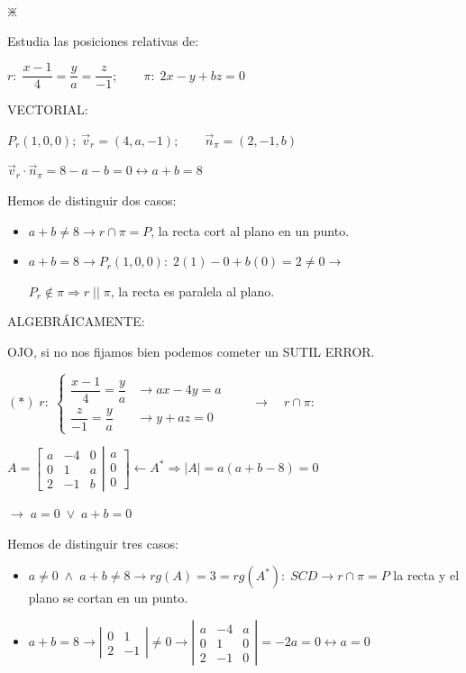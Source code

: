 \begin{ejre}$\boldsymbol{ \divideontimes }$
	
	Estudia las posiciones relativas de:
	
	$r:\;\dfrac{x-1}{4}=\dfrac{y}{a}=\dfrac{z}{-1};\qquad \pi:\; 2x-y+bz=0$
\end{ejre}
\begin{proofw}\renewcommand{\qedsymbol}{$\diamond$}	
\noindent 	VECTORIAL:

\noindent $P_r(1,0,0);\; \vec v_r=(4,a,-1);\qquad \vec n_{\pi}=(2,-1,b)$

\noindent $\vec v_r \cdot \vec n_{\pi}=8-a-b=0 \leftrightarrow a+b=8$

\noindent Hemos de distinguir dos casos:

\begin{itemize}
\item $a+b\neq 8 \to r\cap \pi=P$, la recta cort al plano en un punto.
\item $a+b=8 \to P_r(1,0,0) :\; 2(1)-0+b(0)=2\neq 0 \to $

$P_r\notin \pi \Rightarrow r\;||\;\pi$, la recta es paralela al plano.	
\end{itemize}


\noindent ALGEBRÁICAMENTE:


\noindent OJO, si no nos fijamos bien podemos cometer un SUTIL ERROR.

\noindent $(*)\;r:\;\begin{cases} \dfrac {x-1}4=\dfrac y a &\to ax-4y=a
\\ \dfrac z{-1}=\dfrac y a &\to 	y+az=0
\end{cases} \qquad \longrightarrow \quad r\cap \pi:$

\noindent $A=\left[ \begin{matrix} a&-4&0\\0&1&a\\2&-1&b \end{matrix}\right. \left| \begin{matrix} a\\0\\0 \end{matrix}\right] \leftarrow A^* \Rightarrow |A|=a(a+b-8)=0 $

\noindent $\to  \;a=0\;\vee\;a+b=0 $

\noindent Hemos de distinguir tres casos:

\begin{itemize}
\item $a\neq 0 \; \wedge\; a+b\neq 8 \to rg(A)=3=rg(A^*):\; SCD \to r\cap \pi =P$ la recta y el plano se cortan en un punto.
\item $a+b=8 \to \left|\begin{matrix} 0&1\\2&-1 \end{matrix}\right|\neq 0\to \left|\begin{matrix}a&-4&a\\0&1&0\\2&-1&0 \end{matrix}\right|=-2a=0 \leftrightarrow a=0$


\end{itemize}
\end{proofw}
